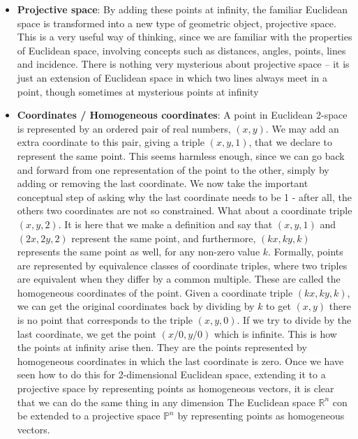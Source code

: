 \documentclass{report}
\begin{document}
\begin{itemize}
            \bigbreak \noindent 
            Coincident planes are planes that lie directly on top of each other.
        \item \textbf{Projective space}: By adding these points at infinity, the familiar Euclidean space is transformed into a new type of geometric object, projective space. This is a very useful way of thinking, since we are familiar with the properties of Euclidean space, involving concepts such as distances, angles, points, lines and incidence. There is nothing very mysterious about projective space – it is just an extension of Euclidean space in which two lines always meet in a point, though sometimes at mysterious points at infinity
        \item \textbf{Coordinates / Homogeneous coordinates}: 
            A point in Euclidean 2-space is represented by an ordered pair of real numbers, $(x, y)$. We may add an extra coordinate to this pair, giving a triple $(x, y, 1)$, that we declare to represent the same point. This seems harmless enough, since we can go back and forward from one representation of the point to the other, simply by adding or removing the last coordinate. We now take the important conceptual step of asking why the last coordinate needs to be 1 - after all, the others two coordinates are not so constrained. What about a coordinate triple $(x, y, 2)$. It is here that we make a definition and say that $(x, y, 1)$ and $(2x, 2y, 2)$ represent the same point, and furthermore, $(kx, ky, k)$ represents the same point as well, for any non-zero value $k$. Formally, points are represented by equivalence classes of coordinate triples, where two triples are equivalent when they differ by a common multiple. These are called the homogeneous coordinates of the point.
            \bigbreak \noindent 
            Given a coordinate triple $(kx, ky, k)$, we can get the original coordinates back by dividing by $k$ to get $(x,y)$
            \bigbreak \noindent 
            there is no point that corresponds to the triple $(x, y, 0)$. If we try to divide by the last coordinate, we get the point $(x/0, y/0)$ which is infinite. This is how the points at infinity arise then. They are the points represented by homogeneous coordinates in which the last coordinate is zero.
            \bigbreak \noindent 
            Once we have seen how to do this for 2-dimensional Euclidean space, extending it to a projective space by representing points as homogeneous vectors, it is clear that we can do the same thing in any dimension
            \bigbreak \noindent 
            The Euclidean space $\mathbb{R}^{n}$ con be extended to a projective space $\mathbb{P}^{n}$ by representing points as homogeneous vectors.

\end{itemize}
\end{document}
